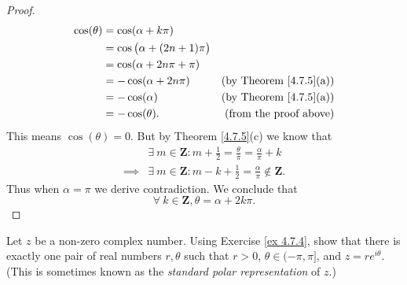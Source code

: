 \begin{proof}
\begin{align*}
        \cos(\theta) & = \cos(\alpha + k \pi)                                                     \\
                     & = \cos\big(\alpha + (2n + 1) \pi\big)                                      \\
                     & = \cos(\alpha + 2 n \pi + \pi)                                             \\
                     & = -\cos(\alpha + 2 n \pi)             & \text{(by Theorem \ref{4.7.5}(a))} \\
                     & = -\cos(\alpha)                       & \text{(by Theorem \ref{4.7.5}(a))} \\
                     & = -\cos(\theta).                      & \text{(from the proof above)}
    \end{align*}
    This means \(\cos(\theta) = 0\).
    But by Theorem \ref{4.7.5}(c) we know that
    \begin{align*}
                 & \exists\ m \in \mathbf{Z} : m + \frac{1}{2} = \frac{\theta}{\pi} = \frac{\alpha}{\pi} + k \\
        \implies & \exists\ m \in \mathbf{Z} : m - k + \frac{1}{2} = \frac{\alpha}{\pi} \notin \mathbf{Z}.
    \end{align*}
    Thus when \(\alpha = \pi\) we derive contradiction.
    We conclude that
    \[
        \forall\ k \in \mathbf{Z}, \theta = \alpha + 2 k \pi.
    \]
\end{proof}

\begin{exercise}\label{ex 4.7.6}
    Let \(z\) be a non-zero complex number.
    Using Exercise \ref{ex 4.7.4}, show that there is exactly one pair of real numbers \(r, \theta\) such that \(r > 0\), \(\theta \in (-\pi, \pi]\), and \(z = r e^{i \theta}\).
    (This is sometimes known as the \emph{standard polar representation} of \(z\).)
\end{exercise}

